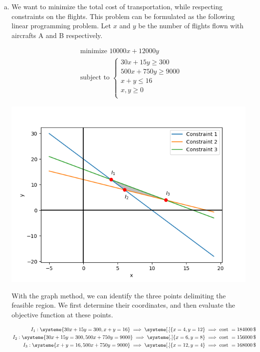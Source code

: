 \documentclass[a4paper, 10pt, twoside]{article}
\begin{document}
\begin{enumerate}[a)]
    \item We want to minimize the total cost of transportation, while respecting constraints on the flights. This problem can be formulated as the following linear programming problem.
          Let $x$ and $y$ be the number of flights flown with aircrafts A and B respectively.

          \begin{align*}
               & \text{minimize } 10000x + 12000y \\
               & \text{subject to }
              \begin{cases}
                  30 x + 15 y \ge 300    \\
                  500 x + 750 y \ge 9000 \\
                  x + y \le 16                         \\
                  x, y \ge 0                           \\
              \end{cases}
          \end{align*}

          \begin{center}
              \includegraphics[width = .5\textwidth]{graph2.png}
          \end{center}

          With the graph method, we can identify the three points delimiting the feasible region. We first determine their coordinates, and then evaluate the objective function at these points.

          \begin{align*}
              I_1 :
              \systeme{
                  30x+15y=300,
                  x+y=16
              }
              \implies
              \systeme[.]{
                  x=4,
                  y=12
              }
              \implies \text{cost } = 184000\,\$ \\
              I_2 :
              \systeme{
                  30x+15y=300,
                  500x+750y=9000
              }
              \implies
              \systeme[.]{
                  x=6,
                  y=8
              }
              \implies \text{cost } = 156000\,\$ \\
              I_3 :
              \systeme{
                  x+y=16,
                  500x+750y=9000
              }
              \implies
              \systeme[.]{
                  x=12,
                  y=4
              }
              \implies \text{cost } = 168000\,\$ \\
          \end{align*}


\end{enumerate}
\end{document}
